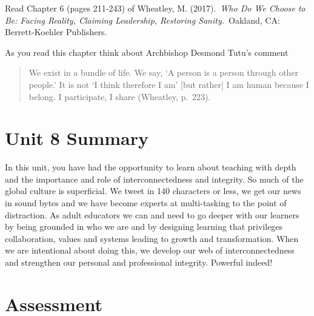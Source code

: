 \documentclass[
]{book}
\begin{document}
\begin{reflect}
Read Chapter 6 (pages 211-243) of Wheatley, M. (2017).~\emph{Who Do We
Choose to Be: Facing Reality, Claiming Leadership, Restoring
Sanity.}~Oakland, CA: Berrett-Koehler Publishers.

As you read this chapter think about Archbishop Desmond Tutu's comment

\begin{quote}
We exist in a bundle of life. We say, `A person is a person through
other people.' It is not `I think therefore I am' {[}but rather{]} I am
human because I belong. I participate, I share (Wheatley, p.~223).
\end{quote}
\end{reflect}

\hypertarget{unit-8-summary}{%
\section*{Unit 8 Summary}\label{unit-8-summary}}

In this unit, you have had the opportunity to learn about teaching with depth and the importance and role of interconnectedness and integrity. So much of the global culture is superficial. We tweet in 140 characters or less, we get our news in sound bytes and we have become experts at multi-tasking to the point of distraction. As adult educators we can and need to go deeper with our learners by being grounded in who we are and by designing learning that privileges collaboration, values and systems leading to growth and transformation. When we are intentional about doing this, we develop our web of interconnectedness and strengthen our personal and professional integrity. Powerful indeed!

\hypertarget{assessment-7}{%
\section*{Assessment}\label{assessment-7}}
\end{document}
